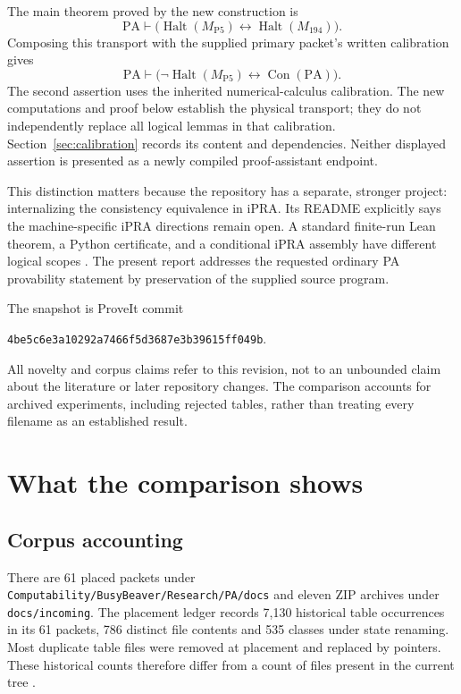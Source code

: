 \documentclass[11pt,letterpaper]{article}
\newcommand{\PA}{\mathrm{PA}}
\newcommand{\Con}{\operatorname{Con}}
\newcommand{\Halt}{\operatorname{Halt}}
\newcommand{\file}[1]{\texttt{\nolinkurl{#1}}}
\newcommand{\old}{M_{194}}
\newcommand{\new}{M_{\mathrm{P5}}}
\newcommand{\snapshot}{\texttt{4be5c6e3a10292a7466f5d3687e3b39615ff049b}}
\begin{document}
The main theorem proved by the new construction is
\[
             \PA\vdash
             \bigl(\Halt(\new)\leftrightarrow\Halt(\old)\bigr).
\]
Composing this transport with the supplied primary packet's written
calibration gives
\[
             \PA\vdash
             \bigl(\neg\Halt(\new)\leftrightarrow\Con(\PA)\bigr).
\]
The second assertion uses the inherited numerical-calculus calibration.
The new computations and proof below establish the physical transport;
they do not independently replace all logical lemmas in that
calibration. Section~\ref{sec:calibration} records its content and
dependencies. Neither displayed assertion is presented as a newly
compiled proof-assistant endpoint.

This distinction matters because the repository has a separate,
stronger project: internalizing the consistency equivalence in iPRA.
Its README explicitly says the machine-specific iPRA directions remain
open. A standard finite-run Lean theorem, a Python certificate, and a
conditional iPRA assembly have different logical scopes
\cite{status}. The present report addresses the requested ordinary PA
provability statement by preservation of the supplied source program.

The snapshot is ProveIt commit
\begin{center}\small\snapshot.\end{center}
All novelty and corpus claims refer to this revision, not to an
unbounded claim about the literature or later repository changes.
The comparison accounts for archived experiments, including rejected
tables, rather than treating every filename as an established result.

\section{What the comparison shows}

\subsection{Corpus accounting}

There are 61 placed packets under
\file{Computability/BusyBeaver/Research/PA/docs} and eleven ZIP archives
under \file{docs/incoming}. The placement ledger records 7,130
historical table occurrences in its 61 packets, 786 distinct file
contents and 535 classes under state renaming. Most duplicate table
files were removed at placement and replaced by pointers. These
historical counts therefore differ from a count of files present in
the current tree \cite{catalog,placement}.
\end{document}
